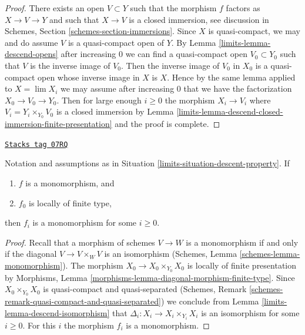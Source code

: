 \begin{proof}

There exists an open $V \subset Y$ such that the morphism
$f$ factors as $X \to V \to Y$ and such that $X \to V$ is
a closed immersion, see discussion in
Schemes, Section \ref{schemes-section-immersions}.
Since $X$ is quasi-compact, we may and do assume $V$ is a quasi-compact open
of $Y$. By Lemma \ref{limits-lemma-descend-opens} after increasing $0$
we can find a quasi-compact open $V_0 \subset Y_0$ such that
$V$ is the inverse image of $V_0$. Then the inverse image of
$V_0$ in $X_0$ is a quasi-compact open whose inverse image in $X$ is $X$.
Hence by the same lemma applied to $X = \lim X_i$ we may
assume after increasing $0$ that we have the factorization
$X_0 \to V_0 \to Y_0$. Then for large enough $i \geq 0$ the morphism
$X_i \to V_i$ where $V_i = Y_i \times_{Y_0} V_0$ is a closed immersion by
Lemma \ref{limits-lemma-descend-closed-immersion-finite-presentation}
and the proof is complete.
\end{proof}

\begin{lemma}
\label{limits-lemma-descend-monomorphism}
\href{https://stacks.math.columbia.edu/tag/07RQ}{\texttt{Stacks tag 07RQ}}

Notation and assumptions as in Situation \ref{limits-situation-descent-property}.
If
\begin{enumerate}
\item $f$ is a monomorphism, and
\item $f_0$ is locally of finite type,
\end{enumerate}
then $f_i$ is a monomorphism for some $i \geq 0$.
\end{lemma}

\begin{proof}

Recall that a morphism of schemes $V \to W$ is a monomorphism if and
only if the diagonal $V \to V \times_W V$ is an isomorphism
(Schemes, Lemma \ref{schemes-lemma-monomorphism}).
The morphism $X_0 \to X_0 \times_{Y_0} X_0$ is locally of finite
presentation by
Morphisms, Lemma \ref{morphisms-lemma-diagonal-morphism-finite-type}.
Since $X_0 \times_{Y_0} X_0$ is quasi-compact and quasi-separated
(Schemes, Remark \ref{schemes-remark-quasi-compact-and-quasi-separated})
we conclude from
Lemma \ref{limits-lemma-descend-isomorphism}
that $\Delta_i : X_i \to X_i \times_{Y_i} X_i$ is an isomorphism for
some $i \geq 0$. For this $i$ the morphism $f_i$ is a monomorphism.
\end{proof}

